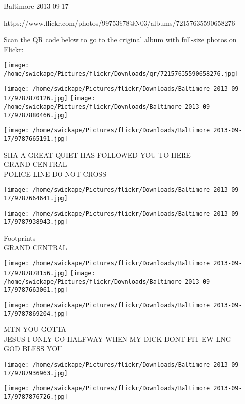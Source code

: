 \documentclass[10pt,letterpaper]{article}
\begin{document}
Baltimore 2013-09-17

https://www.flickr.com/photos/99753978@N03/albums/72157635590658276

Scan the QR code below to go to the original album with full-size photos on Flickr:

\texttt{[image: /home/swickape/Pictures/flickr/Downloads/qr/72157635590658276.jpg]}
\pagebreak

\texttt{[image: /home/swickape/Pictures/flickr/Downloads/Baltimore 2013-09-17/9787870126.jpg]}
\texttt{[image: /home/swickape/Pictures/flickr/Downloads/Baltimore 2013-09-17/9787880466.jpg]}

\vspace{0.25in}
\texttt{[image: /home/swickape/Pictures/flickr/Downloads/Baltimore 2013-09-17/9787665191.jpg]}

SHA A GREAT QUIET HAS FOLLOWED YOU TO HERE\\
GRAND CENTRAL\\
POLICE LINE DO NOT CROSS
\pagebreak

\texttt{[image: /home/swickape/Pictures/flickr/Downloads/Baltimore 2013-09-17/9787664641.jpg]}

\vspace{0.25in}
\texttt{[image: /home/swickape/Pictures/flickr/Downloads/Baltimore 2013-09-17/9787938943.jpg]}

Footprints\\
GRAND CENTRAL
\pagebreak

\texttt{[image: /home/swickape/Pictures/flickr/Downloads/Baltimore 2013-09-17/9787878156.jpg]}
\texttt{[image: /home/swickape/Pictures/flickr/Downloads/Baltimore 2013-09-17/9787663061.jpg]}

\vspace{0.25in}
\texttt{[image: /home/swickape/Pictures/flickr/Downloads/Baltimore 2013-09-17/9787869204.jpg]}

MTN YOU GOTTA\\
JESUS I ONLY GO HALFWAY WHEN MY DICK DONT FIT EW LNG\\
GOD BLESS YOU
\pagebreak

\texttt{[image: /home/swickape/Pictures/flickr/Downloads/Baltimore 2013-09-17/9787936963.jpg]}

\vspace{0.25in}
\texttt{[image: /home/swickape/Pictures/flickr/Downloads/Baltimore 2013-09-17/9787876726.jpg]}
\end{document}
